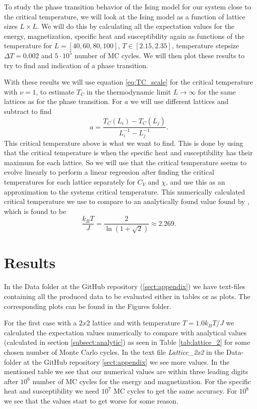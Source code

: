 \documentclass[12pt,a4paper,english]{article}
\begin{document}
To study the phase transition behavior of the Ising model for our system close to the critical temperature, we will look at the Ising model as a function of lattice sizes $L\times L$. We will do this by calculating all the expectation values for the energy, magnetization, specific heat and susceptibility again as functions of the temperature for $L=[40,60,80,100]$, $T\in[2.15, 2.35]$, temperature stepsize $\Delta T=0.002$ and $5\cdot10^5$ number of MC cycles. We will then plot these results to try to find and indication of a phase transition. 

With these results we will use equation \ref{eq:TC_scale} for the critical temperature with $\nu=1$, to estimate $T_C$ in the thermodynamic limit $L\rightarrow \infty$ for the same lattices as for the phase transition. For $a$ we will use different lattices and subtract to find
\begin{equation}
\label{eq:find_a}
a=\frac{T_C(L_i)-T_C(L_j)}{L_i^{-1}-L_j^{-1}}.
\end{equation}
This critical temperature above is what we want to find. This is done by using that the critical temperature is when the specific heat and susceptibility has their maximum for each lattice. So we will use that the critical temperature seems to evolve linearly to perform a linear regression after finding the critical temperatures for each lattice separately for $C_V$ and $\chi$, and use this as an approximation to the systems critical temperature. This numerically calculated critical temperature we use to compare to an analytically found value found by \citet{PhysRev.65.117}, which is found to be
\begin{equation}
\label{eq:TC_analytic}
\frac{k_BT}{J}=\frac{2}{\ln(1+\sqrt{2})}\approx 2.269.
\end{equation}

\section{Results}
In the Data folder at the GitHub repository (\ref{sect:appendix}) we have text-files containing all the produced data to be evaluated either in tables or as plots. The corresponding plots can be found in the Figures folder.

For the first case with a $2x2$ lattice and with temperature $T=1.0 k_BT/J$ we calculated the expectation values numerically to compare with analytical values (calculated in section \ref{subsect:analytic}) as seen in Table \ref{tab:lattice_2} for some chosen number of Monte Carlo cycles. In the text file \textit{Lattice\_2x2} in the Data-folder at the GitHub repository \ref{sect:appendix} we see more values. In the mentioned table we see that our numerical values are within three leading digits after $10^6$ number of MC cycles for the energy and magnetization. For the specific heat and susceptibility we need $10^7$ MC cycles to get the same accuracy. For $10^8$ we see that the values start to get worse for some reason. 
\end{document}

